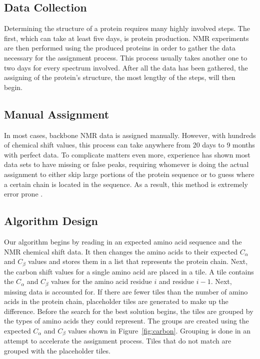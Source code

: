 \documentclass[12pt, letter]{article}
\begin{document}
\subsection{Data Collection} %
\label{sub:data_collection}
Determining the structure of a protein requires many highly involved steps. The first, which can take at least five days, is protein production. NMR experiments are then performed using the produced proteins in order to gather the data necessary for the assignment process. This process usually takes another one to two days for every spectrum involved. After all the data has been gathered, the assigning of the protein's structure, the most lengthy of the steps, will then begin. \cite{babak_alipanahi_error_2011}

\subsection{Manual Assignment} %
\label{sub:manual_assignment}
In most cases, backbone NMR data is assigned manually. However, with hundreds of chemical shift values, this process can take anywhere from 20 days to 9 months with perfect data\cite{guntert_automated_2009}. To complicate matters even more, experience has shown most data sets to have missing or false peaks, requiring whomever is doing the actual assignment to either skip large portions of the protein sequence or to guess where a certain chain is located in the sequence. As a result, this method is extremely error prone \cite{babak_alipanahi_error_2011}.


\subsection{Algorithm Design} %
\label{sub:algorithm}
Our algorithm begins by reading in an expected amino acid sequence and the NMR chemical shift data. It then changes the amino acids to their expected $C_\alpha$ and $C_{\beta}$ values and stores them in a list that represents the protein chain. Next, the carbon shift values for a single amino acid are placed in a tile. A tile contains the $C_\alpha$ and $C_{\beta}$ values for the amino acid residue $i$ and residue $i-1$. Next, missing data is accounted for. If there are fewer tiles than the number of amino acids in the protein chain, placeholder tiles are generated to make up the difference. Before the search for the best solution begins, the tiles are grouped by the types of amino acids they could represent. The groups are created using the expected $C_\alpha$ and $C_{\beta}$ values shown in Figure~\ref{fig:carbon}. Grouping is done in an attempt to accelerate the assignment process. Tiles that do not match are grouped with the placeholder tiles. 
\end{document}
